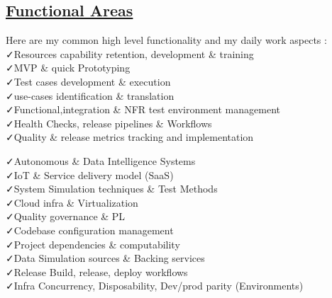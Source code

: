 \documentclass[]{cv-class}
\begin{document}
\begin{aside}
    \section{ \underline{Functional Areas}}
    \vspace{2mm}
   Here are my common high level functionality and my daily work aspects :\\ 
    \vspace{2mm} \faCheck Resources capability retention, development \& training \\
  \vspace{2mm} \faCheck MVP \& quick Prototyping \\

  \vspace{2mm} \faCheck Test cases development \& execution \\
  \vspace{2mm} \faCheck use-cases identification \& translation \\
  \vspace{2mm} \faCheck Functional,integration \& NFR test environment management \\
\vspace{2mm} \faCheck Health Checks, release pipelines \& Workflows \\
\vspace{2mm} \faCheck Quality \& release metrics tracking and implementation \\ \vspace{2mm}

\vspace{2mm} \faCheck Autonomous \& Data Intelligence Systems \\
\vspace{2mm} \faCheck IoT \& Service delivery model (SaaS) \\
\vspace{2mm} \faCheck System Simulation techniques \& Test Methods \\
\vspace{2mm} \faCheck Cloud infra \& Virtualization \\
\vspace{2mm} \faCheck Quality governance \& PL \\
\vspace{2mm} \faCheck Codebase configuration management \\
\vspace{2mm} \faCheck Project dependencies \& computability \\
\vspace{2mm} \faCheck Data Simulation sources \& Backing services \\
\vspace{2mm} \faCheck Release Build, release, deploy workflows \\
\vspace{2mm} \faCheck Infra Concurrency, Disposability, Dev/prod parity (Environments) \\ 


\end{aside}
\end{document}
